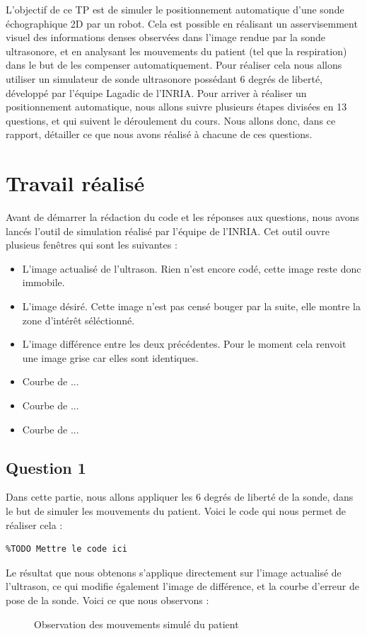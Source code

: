 \documentclass[a4paper,11pt]{article}
\begin{document}
L'objectif de ce TP est de simuler le positionnement automatique d'une sonde \'echographique 2D par un robot. Cela est possible en r\'ealisant un asservisemment visuel des informations denses observ\'ees dans l'image rendue par la sonde ultrasonore, et en analysant les mouvements du patient (tel que la respiration) dans le but de les compenser automatiquement.
Pour r\'ealiser cela nous allons utiliser un simulateur de sonde ultrasonore poss\'edant 6 degr\'es de libert\'e, d\'evelopp\'e par l'\'equipe Lagadic de l'INRIA. Pour arriver \`a r\'ealiser un positionnement automatique, nous allons suivre plusieurs \'etapes divis\'ees en 13 questions, et qui suivent le d\'eroulement du cours. Nous allons donc, dans ce rapport, d\'etailler ce que nous avons r\'ealis\'e \`a chacune de ces questions.


\section{Travail r\'ealis\'e}
Avant de d\'emarrer la r\'edaction du code et les r\'eponses aux questions, nous avons lanc\'es l'outil de simulation r\'ealis\'e par l'\'equipe de l'INRIA. Cet outil ouvre plusieus fen\^etres qui sont les suivantes :
\begin{itemize}
\item L'image actualis\'e de l'ultrason. Rien n'est encore cod\'e, cette image reste donc immobile.
\item L'image d\'esir\'e. Cette image n'est pas cens\'e bouger par la suite, elle montre la zone d'int\'er\^et s\'el\'ectionn\'e.
\item L'image diff\'erence entre les deux pr\'ec\'edentes. Pour le moment cela renvoit une image grise car elles sont identiques.
\item Courbe de ... %
\item Courbe de ... %
\item Courbe de ... %
\end{itemize}

\subsection{Question 1}
Dans cette partie, nous allons appliquer les 6 degr\'es de libert\'e de la sonde, dans le but de simuler les mouvements du patient. Voici le code qui nous permet de r\'ealiser cela :
\begin{verbatim}
%TODO Mettre le code ici
\end{verbatim}
Le r\'esultat que nous obtenons s'applique directement sur l'image actualis\'e de l'ultrason, ce qui modifie \'egalement l'image de diff\'erence, et la courbe d'erreur de pose de la sonde. Voici ce que nous observons :
\begin{figure}[h]
	\centering
	\caption{Observation des mouvements simul\'e du patient}
	\label{mvtPatient}
\end{figure}
\end{document}
